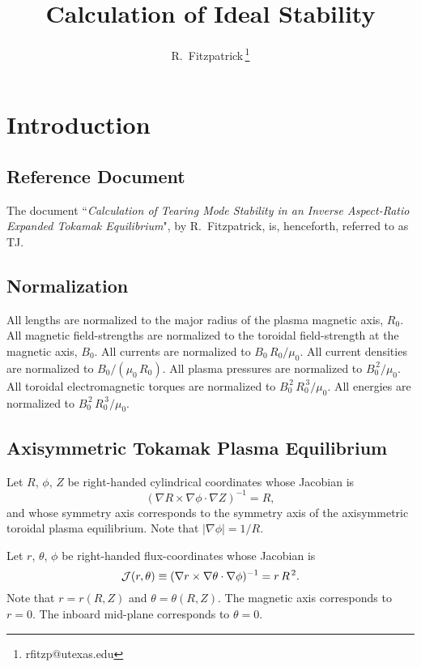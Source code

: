 \documentclass[12pt,prb,aps,notitlepage]{revtex4-1}
\begin{document}
\title{Calculation of Ideal Stability}
\author{R.~Fitzpatrick\,\footnote{rfitzp@utexas.edu}}
\begin{abstract}
\end{abstract}
\maketitle

\section{Introduction}
\subsection{Reference Document}
The document ``{\em Calculation of Tearing Mode Stability in an Inverse Aspect-Ratio Expanded Tokamak Equilibrium}", by R.~Fitzpatrick,  is, henceforth,
referred to as TJ. 

\subsection{Normalization}\label{coords}
All lengths are normalized to  the major radius of the plasma magnetic axis, $R_0$. All magnetic field-strengths
are normalized to the  toroidal field-strength at the magnetic axis, $B_0$. All currents are normalized to $B_0\,R_0/\mu_0$. All current densities are normalized to $B_0/(\mu_0\,R_0)$.  All plasma pressures are normalized to $B_0^{\,2}/\mu_0$.
All toroidal electromagnetic torques are normalized to $B_0^{\,2}\,R_0^{\,3}/\mu_0$. All energies are normalized to $B_0^{\,2}\,R_0^{\,3}/\mu_0$. 

\subsection{Axisymmetric Tokamak Plasma Equilibrium}\label{s3}
Let $R$, $\phi$, $Z$ be right-handed cylindrical coordinates whose Jacobian 
is
\begin{equation}
(\nabla R\times \nabla\phi\cdot\nabla Z)^{-1} = R,
\end{equation}
and whose symmetry axis corresponds to the symmetry axis of the axisymmetric toroidal plasma equilibrium. 
Note that $|\nabla\phi|=1/R$. 

Let $r$, $\theta$, $\phi$ be right-handed flux-coordinates whose
Jacobian is
\begin{equation}\label{jac}
{\cal J}(r,\theta)\equiv (\nabla r\times \nabla\theta\cdot\nabla\phi)^{-1}= r\,R^{\,2}.
\end{equation}
Note that $r=r(R,Z)$ and $\theta=\theta(R,Z)$. 
The magnetic axis corresponds to $r=0$. The inboard mid-plane corresponds to $\theta=0$. 
\end{document}
